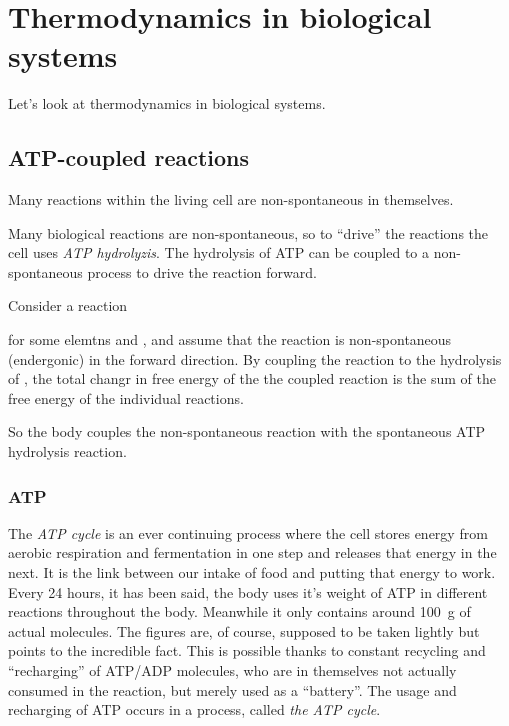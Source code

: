 \documentclass[../mit-general-chemistry.tex]{subfiles}
\begin{document}
\chapter{Thermodynamics in biological systems}

Let's look at thermodynamics in biological systems.


\section{ATP-coupled reactions}


Many reactions within the living cell are non-spontaneous in
themselves. 



Many biological reactions are non-spontaneous, so to ``drive'' the
reactions the cell uses {\em ATP hydrolyzis}. The hydrolysis of ATP
can be coupled to a non-spontaneous process to drive the reaction
forward.

Consider a reaction

\begin{center}
\end{center}

for some elemtns  and , and assume that the reaction is
non-spontaneous (endergonic) in the forward direction. By coupling the reaction to
the hydrolysis of , the total changr in free energy of the the
coupled reaction is the sum of the free energy of the individual
reactions.

So the body couples the non-spontaneous reaction with the spontaneous
ATP hydrolysis reaction.




\subsection{ATP}



The {\em ATP cycle} is an ever continuing process where the cell
stores energy from aerobic respiration and fermentation in one step
and releases that energy in the next. It is the link between our
intake of food and putting that energy to work. Every 24 hours, it has
been said, the body uses it's weight of ATP in different reactions
throughout the body. Meanwhile it only contains around \SI{100}{\gram}
of actual molecules. The figures are, of course, supposed to be taken
lightly but points to the incredible fact. This is possible thanks to
constant recycling and ``recharging'' of ATP/ADP molecules, who are in
themselves not actually consumed in the reaction, but merely used as a
``battery''. The usage and recharging of ATP occurs in a process,
called {\em the ATP cycle}.
\end{document}
